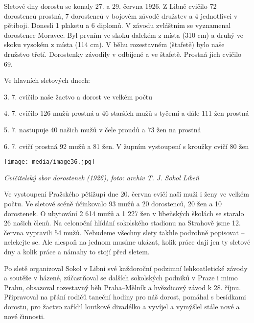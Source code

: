Sletové dny dorostu se konaly 27. a 29. června 1926. Z Libně cvičilo 72
dorostenců prostná, 7 dorostenců v bojovém závodě družstev a 4
jednotlivci v pětiboji. Donesli 1 plaketu a 6 diplomů. V závodu
zvláštním se vyznamenal dorostenec Moravec. Byl prvním ve skoku dalekém
z místa (310 cm) a druhý ve skoku vysokém z místa (114 cm). V běhu
rozestavném (štafetě) bylo naše družstvo třetí. Dorostenky závodily v
odbíjené a ve štafetě. Prostná jich cvičilo 69.

Ve hlavních sletových dnech:

3. 7. cvičilo naše žactvo a dorost ve velkém počtu

4. 7. cvičilo 126 mužů prostná a 46 starších mužů s tyčemi a dále 111
žen prostná

5. 7. nastupuje 40 našich mužů v čele proudů a 73 žen na prostná

6. 7. cvičí prostná 92 mužů a 81 žen. V župním vystoupení s kroužky
cvičí 80 žen

\texttt{[image: media/image36.jpg]}

\emph{Cvičitelský sbor dorostenek (1926), foto: archiv T. J. Sokol
Libeň}

Ve vystoupení Pražského pětižupí dne 20. června cvičí naši muži i ženy
ve velkém počtu. Ve sletové scéně účinkovalo 93 mužů a 20 dorostenců, 20
žen a 10 dorostenek. O ubytování 2 614 mužů a 1 227 žen v libeňských
školách se staralo 26 našich členů. Na celonoční hlídání sokolského
stadionu na Strahově jsme 12. června vypravili 54 mužů. Nebudeme všechny
slety takhle podrobně popisovat -- nelekejte se. Ale alespoň na jednom
musíme ukázat, kolik práce dají jen ty sletové dny a kolik práce a
námahy to stojí před sletem.

Po sletě organizoval Sokol v Libni své každoroční podzimní
lehkoatletické závody a soutěže v házené, zúčastňoval se dalších
sokolských podniků v Praze i mimo Prahu, obsazoval rozestavný běh
Praha--Mělník a hvězdicový závod k 28. říjnu. Připravoval na přání
rodičů taneční hodiny pro náš dorost, pomáhal s besídkami dorostu, pro
žactvo zařídil loutkové divadélko a vyvíjel a vymýšlel stále nové a nové
činnosti.

